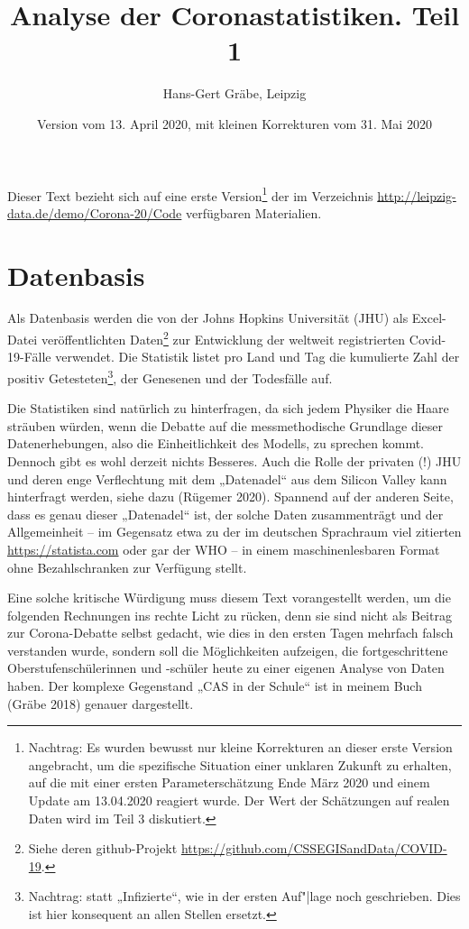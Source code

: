 \documentclass[a4paper,11pt]{article}
\title{Analyse der Coronastatistiken. Teil 1}
\author{Hans-Gert Gräbe, Leipzig}
\date{Version vom 13. April 2020, mit kleinen Korrekturen vom 31. Mai 2020}
\begin{document}
\maketitle

Dieser Text bezieht sich auf eine erste Version\footnote{Nachtrag: Es wurden
  bewusst nur kleine Korrekturen an dieser erste Version angebracht, um die
  spezifische Situation einer unklaren Zukunft zu erhalten, auf die mit einer
  ersten Parameterschätzung Ende März 2020 und einem Update am 13.04.2020
  reagiert wurde. Der Wert der Schätzungen auf realen Daten wird im Teil 3
  diskutiert.} der im Verzeichnis
\url{http://leipzig-data.de/demo/Corona-20/Code} verfügbaren Materialien.

\section{Datenbasis}

Als Datenbasis werden die von der Johns Hopkins Universität (JHU) als
Excel-Datei veröffentlichten Daten\footnote{Siehe deren github-Projekt
  \url{https://github.com/CSSEGISandData/COVID-19}.} zur Entwicklung der
weltweit registrierten Covid-19-Fälle verwendet. Die Statistik listet pro Land
und Tag die kumulierte Zahl der positiv Getesteten\footnote{Nachtrag: statt
  „Infizierte“, wie in der ersten Auf"|lage noch geschrieben.  Dies ist hier
  konsequent an allen Stellen ersetzt.}, der Genesenen und der Todesfälle auf.

Die Statistiken sind natürlich zu hinterfragen, da sich jedem Physiker die
Haare sträuben würden, wenn die Debatte auf die messmethodische Grundlage
dieser Datenerhebungen, also die Einheitlichkeit des Modells, zu sprechen
kommt.  Dennoch gibt es wohl derzeit nichts Besseres. Auch die Rolle der
privaten (!)  JHU und deren enge Verflechtung mit dem „Datenadel“ aus dem
Silicon Valley kann hinterfragt werden, siehe dazu (Rügemer 2020).  Spannend
auf der anderen Seite, dass es genau dieser „Datenadel“ ist, der solche Daten
zusammenträgt und der Allgemeinheit -- im Gegensatz etwa zu der im deutschen
Sprachraum viel zitierten \url{https://statista.com} oder gar der WHO -- in
einem maschinenlesbaren Format ohne Bezahlschranken zur Verfügung stellt.

Eine solche kritische Würdigung muss diesem Text vorangestellt werden, um die
folgenden Rechnungen ins rechte Licht zu rücken, denn sie sind nicht als
Beitrag zur Corona-Debatte selbst gedacht, wie dies in den ersten Tagen
mehrfach falsch verstanden wurde, sondern soll die Möglichkeiten aufzeigen,
die fortgeschrittene Oberstufenschülerinnen und -schüler heute zu einer
eigenen Analyse von Daten haben.  Der komplexe Gegenstand „CAS in der Schule“
ist in meinem Buch (Gräbe 2018) genauer dargestellt. 
\end{document}

